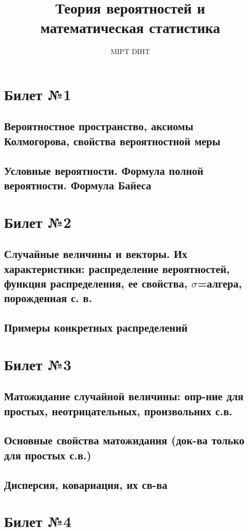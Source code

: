 \documentclass[a4paper]{article}
\title{Теория вероятностей и математическая статистика}
\author{MIPT DIHT}
\theoremstyle{plain}
\theoremstyle{remark}
\theoremstyle{definition}
\begin{document}
\maketitle

\section{Билет №1}
\subsection{Вероятностное пространство, аксиомы Колмогорова, свойства вероятностной меры}
\subsection{Условные вероятности. Формула полной вероятности. Формула Байеса}

\section{Билет №2}
\subsection{Случайные величины и векторы. Их характеристики: распределение вероятностей, функция распределения, ее свойства, $\sigma$=алгера, порожденная с. в.}
\subsection{Примеры конкретных распределений}

\section{Билет №3}
\subsection{Матожидание случайной величины: опр-ние для простых, неотрицательных, произвольних с.в.}
\subsection{Основные свойства матожидания (док-ва только для простых с.в.)}
\subsection{Дисперсия, ковариация, их св-ва}

\section{Билет №4}
\end{document}
